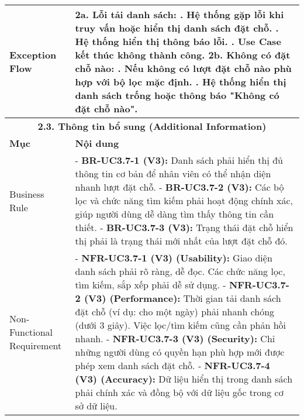 \begin{longtable}{|m{4cm}|p{11cm}|}
\hline
Exception Flow & \textbf{2a. Lỗi tải danh sách:} \newline    1. Hệ thống gặp lỗi khi truy vấn hoặc hiển thị danh sách đặt chỗ. \newline    2. Hệ thống hiển thị thông báo lỗi. \newline    3. Use Case kết thúc không thành công. \newline \textbf{2b. Không có đặt chỗ nào:} \newline    1. Nếu không có lượt đặt chỗ nào phù hợp với bộ lọc mặc định. \newline    2. Hệ thống hiển thị danh sách trống hoặc thông báo "Không có đặt chỗ nào". \\
\hline
\multicolumn{2}{|c|}{\textbf{2.3. Thông tin bổ sung (Additional Information)}} \\
\hline
\textbf{Mục} & \textbf{Nội dung} \\
\hline
Business Rule & - \textbf{BR-UC3.7-1 (V3):} Danh sách phải hiển thị đủ thông tin cơ bản để nhân viên có thể nhận diện nhanh lượt đặt chỗ. \newline - \textbf{BR-UC3.7-2 (V3):} Các bộ lọc và chức năng tìm kiếm phải hoạt động chính xác, giúp người dùng dễ dàng tìm thấy thông tin cần thiết. \newline - \textbf{BR-UC3.7-3 (V3):} Trạng thái đặt chỗ hiển thị phải là trạng thái mới nhất của lượt đặt chỗ đó. \\
\hline
Non-Functional Requirement & - \textbf{NFR-UC3.7-1 (V3) (Usability):} Giao diện danh sách phải rõ ràng, dễ đọc. Các chức năng lọc, tìm kiếm, sắp xếp phải dễ sử dụng. \newline - \textbf{NFR-UC3.7-2 (V3) (Performance):} Thời gian tải danh sách đặt chỗ (ví dụ: cho một ngày) phải nhanh chóng (dưới 3 giây). Việc lọc/tìm kiếm cũng cần phản hồi nhanh. \newline - \textbf{NFR-UC3.7-3 (V3) (Security):} Chỉ những người dùng có quyền hạn phù hợp mới được phép xem danh sách đặt chỗ. \newline - \textbf{NFR-UC3.7-4 (V3) (Accuracy):} Dữ liệu hiển thị trong danh sách phải chính xác và đồng bộ với dữ liệu gốc trong cơ sở dữ liệu. \\
\hline
\end{longtable}

